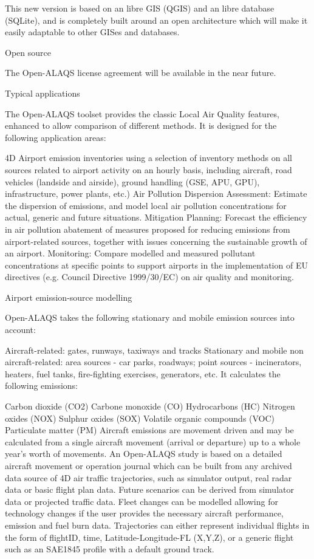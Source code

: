 \documentclass[a4paper,12pt,twoside]{article}
\begin{document}
    This new version is based on an libre GIS (QGIS) and an libre database (SQLite), and is completely built around an open architecture which will make it easily adaptable to other GISes and databases.
    
    Open source
    
    The Open-ALAQS license agreement will be available in the near future.
    
    
    Typical applications
    
    The Open-ALAQS toolset provides the classic Local Air Quality features, enhanced to allow comparison of different methods. It is designed for the following application areas:
    
    4D Airport emission inventories using a selection of inventory methods on all sources related to airport activity on an hourly basis, including aircraft, road vehicles (landside and airside), ground handling (GSE, APU, GPU), infrastructure, power plants, etc.)
    Air Pollution Dispersion Assessment: Estimate the dispersion of emissions, and model local air pollution concentrations for actual, generic and future situations.
    Mitigation Planning: Forecast the efficiency in air pollution abatement of measures proposed for reducing emissions from airport-related sources, together with issues concerning the sustainable growth of an airport.
    Monitoring: Compare modelled and measured pollutant concentrations at specific points to support airports in the implementation of EU directives (e.g. Council Directive 1999/30/EC) on air quality and monitoring.
    
    Airport emission-source modelling
    
    Open-ALAQS takes the following stationary and mobile emission sources into account:
    
    Aircraft-related: gates, runways, taxiways and tracks
    Stationary and mobile non aircraft-related: area sources - car parks, roadways; point sources - incinerators, heaters, fuel tanks, fire-fighting exercises, generators, etc.
    It calculates the following emissions:
    
    Carbon dioxide (CO2)
    Carbone monoxide (CO)
    Hydrocarbons (HC)
    Nitrogen oxides (NOX)
    Sulphur oxides (SOX)
    Volatile organic compounds (VOC)
    Particulate matter (PM)
    Aircraft emissions are movement driven and may be calculated from a single aircraft movement (arrival or departure) up to a whole year’s worth of movements. An Open-ALAQS study is based on a detailed aircraft movement or operation journal which can be built from any archived data source of 4D air traffic  trajectories, such as simulator output, real radar data or basic flight plan data. Future scenarios can be derived from simulator data or projected traffic data. Fleet changes can be modelled allowing for technology changes if the user provides the necessary aircraft performance, emission and fuel burn data. Trajectories can either represent individual flights in the form of flightID, time, Latitude-Longitude-FL (X,Y,Z), or a generic flight such as an SAE1845 profile with a default ground track.
    
\end{document}

